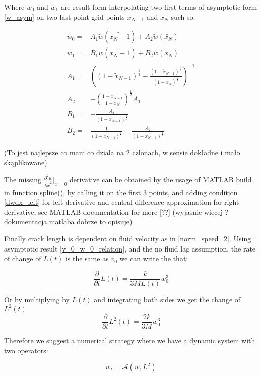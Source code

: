 Where $w_0$ and $w_1$ are result form interpolating two first terms of asymptotic form \eqref{w_asym} on two last point grid points $\tilde x_{N-1}$ and $\tilde x_{N}$ such so:

\begin{align}
w_0=&A_1\tilde w(\tilde {x_N-1})+A_2\tilde w(\tilde {x_N})
\\
w_1=&B_1\tilde w(\tilde {x_N-1})+B_2\tilde w(\tilde {x_N})
\\
A_1=&\left((1-\tilde x_{N-1})^{\frac{1}{3}}-\frac{(1-\tilde x_{N-1})^\frac{1}{2}}{(1-\tilde x_N)^\frac{1}{6}}\right)^{-1}
\\
A_2=&-\left(\frac{1-\tilde x_{N-1}}{1-\tilde x_N}\right)^\frac{1}{2}A_1
\\
B_1=&-\frac{A_1}{(1-x_{N-1})^{\frac{1}{6}}}
\\
B_2=&\frac{1}{(1-x_{N-1})^{\frac{1}{2}}}-\frac{A_2}{(1-x_{N-1})^{\frac{1}{6}}}
\end{align}

(To jest najlepsze co mam co dziala na 2 czlonach, w sensie dokładne i mało skąplikowane)

The missing $\frac{\partial^2 w}{\partial \tilde x^2}|_{\tilde x=0}$ derivative can be obtained by the usage of MATLAB build in function spline(), by calling it on the first 3 points, and adding condition \eqref{dwdx_left} for left derivative and central difference approximation for right derivative, see MATLAB documentation for more [??] (wyjasnic wiecej ? dokumentacja matlaba dobrze to opisuje)

Finally crack length is dependent on fluid velocity as in \eqref{norm_speed_2}. Using asymptotic result \eqref{v_0_w_0_relation}, and the no fluid lag assumption, the rate of change of $L(t)$ is the same as $v_0$ we can write the that:

\begin{equation}\label{dL1}
\frac{\partial}{\partial t}L(t)=\frac{k}{3ML(t)}w_0^3
\end{equation}

Or by multiplying by $L(t)$ and integrating both sides we get the change of $L^2(t)$
\begin{equation}\label{dL2}
\frac{\partial}{\partial t}L^2(t)=\frac{2k}{3M}w_0^3
\end{equation}

Therefore we suggest a numerical strategy where we have a dynamic system with two operators:

\begin{equation}\label{w_operator}
w_t=\mathcal{A}(w,L^2)
\end{equation}

